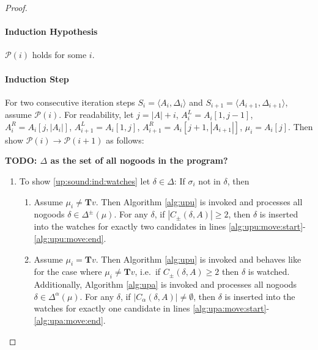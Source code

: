 \documentclass{vutinfth} %
\newcommand{\todo}[1]{{\color{red}\textbf{TODO: {#1}}}} %
\newcommand{\ass}{A}
\newcommand{\bT}{\mathbf{T}}
\newcommand{\cdpm}{C_\pm}
\newcommand{\cdal}{C_\alpha}
\newcommand{\dpm}{\Delta^\pm}
\newcommand{\dal}{\Delta^\alpha}
\newcommand{\welf}{well formed\xspace}
\newcommand{\sgl}{\mu}
\newcommand{\bsgl}{\sigma}
\begin{document}
\begin{proof}

\paragraph{Induction Hypothesis} $\mathcal{P}(i)$ holds for some $i$.

\paragraph{Induction Step} For two consecutive iteration steps $S_{i} = \langle \ass_{i}, \Delta_{i} \rangle$ and $S_{i+1} = \langle \ass_{i+1}, \Delta_{i+1} \rangle$, assume $\mathcal{P}(i)$. For readability, let $j = |A| + i$, $\ass_i^L = \ass_i[1, j - 1]$, $\ass_i^R = \ass_i[j, |\ass_i|]$, $\ass_{i+1}^L = \ass_i[1, j]$, $\ass_{i+1}^R = \ass_i[j + 1,|\ass_{i+1}|]$, $\sgl_i = A_i[j]$. Then show $\mathcal{P}(i) \to \mathcal{P}(i + 1)$ as follows:

\todo{$\Delta$ as the set of all nogoods in the program?}

\begin{enumerate}
\item To show \ref{up:sound:ind:watches} let $\delta \in \Delta$: %
If $\bsgl_i$ not in $\delta$, then 

\begin{enumerate}
	\item Assume $\sgl_i \not = \bT v$. Then Algorithm \ref{alg:upu} is invoked and processes all nogoods $\delta \in \dpm(\sgl)$. For any $\delta$, if $|\cdpm(\delta, A)| \geq 2$, then $\delta$ is inserted into the watches for exactly two candidates in lines \ref{alg:upu:move:start}-\ref{alg:upu:move:end}.
	\item Assume $\sgl_i = \bT v$. Then Algorithm \ref{alg:upu} is invoked and behaves like for the case where $\sgl_i \not = \bT v$, i.e.~if $\cdpm(\delta,\ass) \geq 2$ then $\delta$ is watched. Additionally, Algorithm \ref{alg:upa} is invoked and processes all nogoods $\delta \in \dal(\sgl)$. For any $\delta$, if $|\cdal(\delta, A)| \not = \emptyset$, then $\delta$ is inserted into the watches for exactly one candidate in lines \ref{alg:upa:move:start}-\ref{alg:upa:move:end}. 
\end{enumerate}


\end{enumerate}
\end{proof}
\end{document}
